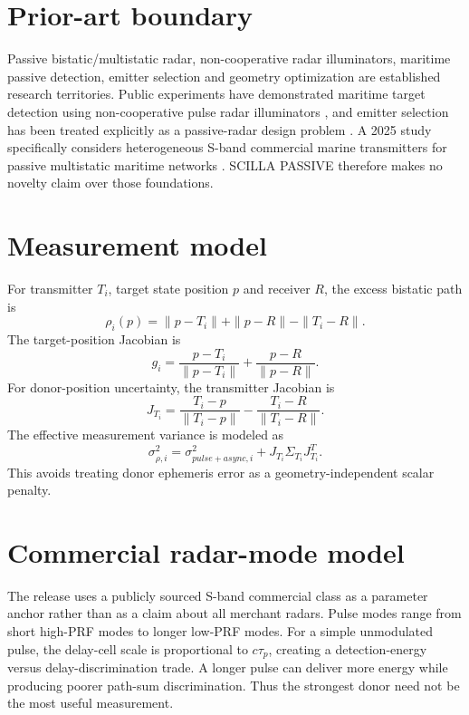 \documentclass[10pt]{article}
\begin{document}
\section{Prior-art boundary}
Passive bistatic/multistatic radar, non-cooperative radar illuminators, maritime passive detection, emitter selection and geometry optimization are established research territories. Public experiments have demonstrated maritime target detection using non-cooperative pulse radar illuminators \cite{jie2019}, and emitter selection has been treated explicitly as a passive-radar design problem \cite{stevens2014}. A 2025 study specifically considers heterogeneous S-band commercial marine transmitters for passive multistatic maritime networks \cite{li2025}. SCILLA PASSIVE therefore makes no novelty claim over those foundations.

\section{Measurement model}
For transmitter $T_i$, target state position $p$ and receiver $R$, the excess bistatic path is
\begin{equation}
\rho_i(p)=\|p-T_i\|+\|p-R\|-\|T_i-R\|.
\end{equation}
The target-position Jacobian is
\begin{equation}
g_i=\frac{p-T_i}{\|p-T_i\|}+\frac{p-R}{\|p-R\|}.
\end{equation}
For donor-position uncertainty, the transmitter Jacobian is
\begin{equation}
J_{T_i}=\frac{T_i-p}{\|T_i-p\|}-\frac{T_i-R}{\|T_i-R\|}.
\end{equation}
The effective measurement variance is modeled as
\begin{equation}
\sigma_{\rho,i}^2=\sigma_{pulse+async,i}^2+J_{T_i}\Sigma_{T_i}J_{T_i}^{T}.
\end{equation}
This avoids treating donor ephemeris error as a geometry-independent scalar penalty.

\section{Commercial radar-mode model}
The release uses a publicly sourced S-band commercial class as a parameter anchor rather than as a claim about all merchant radars. Pulse modes range from short high-PRF modes to longer low-PRF modes. For a simple unmodulated pulse, the delay-cell scale is proportional to $c\tau_p$, creating a detection-energy versus delay-discrimination trade. A longer pulse can deliver more energy while producing poorer path-sum discrimination. Thus the strongest donor need not be the most useful measurement.
\end{document}
